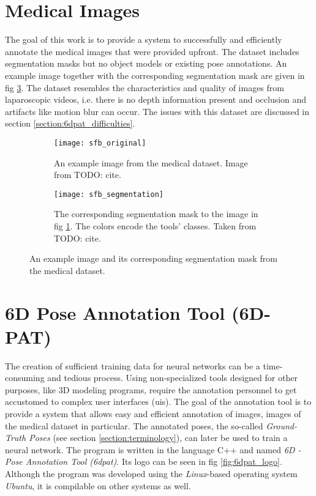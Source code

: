 \section{Medical Images}

The goal of this work is to provide a system to successfully and efficiently annotate the medical images that were provided upfront. The dataset includes segmentation masks but no object models or existing pose annotations. An example image together with the corresponding segmentation mask are given in fig \ref{fig:sfb}. The dataset resembles the characteristics and quality of images from laparoscopic videos, i.e. there is no depth information present and occlusion and artifacts like motion blur can occur. The issues with this dataset are discussed in section \ref{section:6dpat_difficulties}. 

\begin{figure}[!tbp]
	\centering
	\begin{subfigure}[t]{0.47\textwidth}
	\centering
    	\texttt{[image: sfb\_original]}
    	\caption{An example image from the medical dataset. Image from TODO: cite.}
    	\label{fig:sfb_original}
	\end{subfigure}
	\hfill
	\begin{subfigure}[t]{0.47\textwidth}
	\centering
    	\texttt{[image: sfb\_segmentation]}
    	\caption{The corresponding segmentation mask to the image in fig \ref{fig:sfb_original}. The colors encode the tools' classes. Taken from TODO: cite.}
    	\label{fig:sfb_segmentation}
	\end{subfigure}
	\caption{An example image and its corresponding segmentation mask from the medical dataset.}
	\label{fig:sfb}
\end{figure} 

\section{6D Pose Annotation Tool (6D-PAT)}

The creation of sufficient training data for neural networks can be a time-consuming and tedious process. Using non-specialized tools designed for other purposes, like 3D modeling programs, require the annotation personnel to get accustomed to complex user interfaces (\gls{ui}s). The goal of the annotation tool is to provide a system that allows easy and efficient annotation of images, images of the medical dataset in particular. The annotated poses, the so-called \textit{Ground-Truth Poses} (see section \ref{section:terminology}), can later be used to train a neural network. The program is written in the language C++ and named \textit{6D - Pose Annotation Tool (\gls{6dpat})}. Its logo can be seen in fig \ref{fig:6dpat_logo}. Although the program was developed using the \textit{Linux}-based operating system \textit{Ubuntu}, it is compilable on other systems as well.

